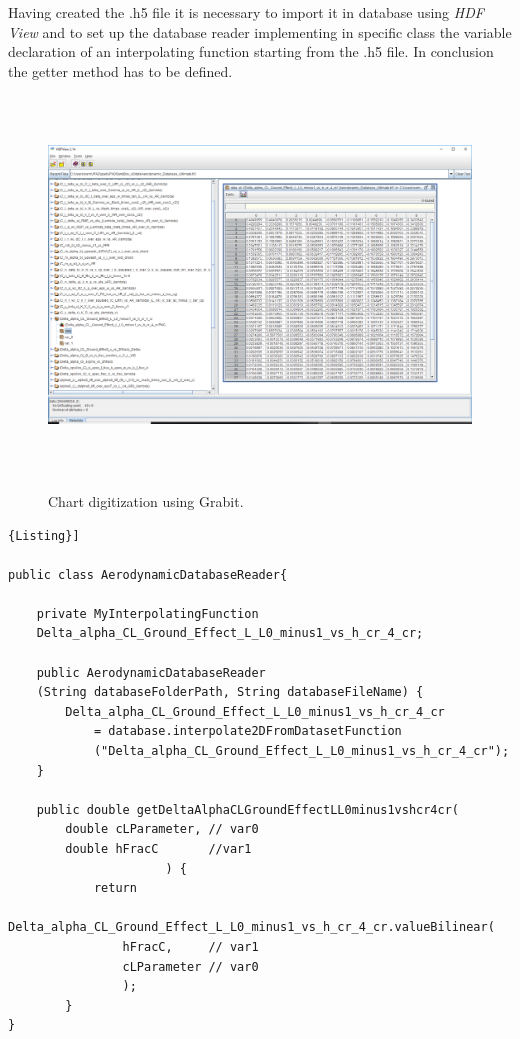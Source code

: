 Having created the .h5 file it is necessary to import it in database using {\itshape HDF View} \cite{HDF} and to set up the database reader implementing in specific class the variable declaration of an interpolating function starting from the .h5 file. In conclusion the getter method has to be defined.

\begin{figure}[H]
\centering
{\includegraphics[height=10cm]{Immagini/AppendiceA/HDF.png}} 
\caption{Chart digitization using Grabit.}
\label{HDF}
\end{figure} 

\bigskip
\lstset{language=Java}
\begin{lstlisting}[frame=rbl,caption={{\footnotesize Java extract from database reader class}},label= [style=\bfseries]{Listing}]

public class AerodynamicDatabaseReader{

	private MyInterpolatingFunction
	Delta_alpha_CL_Ground_Effect_L_L0_minus1_vs_h_cr_4_cr;

	public AerodynamicDatabaseReader
	(String databaseFolderPath, String databaseFileName) {
		Delta_alpha_CL_Ground_Effect_L_L0_minus1_vs_h_cr_4_cr
			= database.interpolate2DFromDatasetFunction
			("Delta_alpha_CL_Ground_Effect_L_L0_minus1_vs_h_cr_4_cr");
	}
						
	public double getDeltaAlphaCLGroundEffectLL0minus1vshcr4cr(
		double cLParameter,	// var0
		double hFracC		//var1
                      ) { 
			return 
			Delta_alpha_CL_Ground_Effect_L_L0_minus1_vs_h_cr_4_cr.valueBilinear(
				hFracC,		// var1
				cLParameter	// var0
				);
		}
}
\end{lstlisting}

\noindent \\ \\ 




